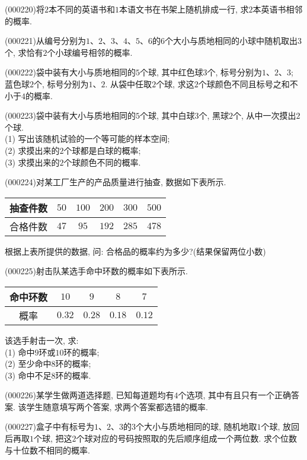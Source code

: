 \item (000220)将$2$本不同的英语书和$1$本语文书在书架上随机排成一行, 求$2$本英语书相邻的概率.
\item (000221)从编号分别为$1$、$2$、$3$、$4$、$5$、$6$的$6$个大小与质地相同的小球中随机取出$3$个, 求恰有$2$个小球编号相邻的概率.
\item (000222)袋中装有大小与质地相同的$5$个球, 其中红色球$3$个, 标号分别为$1$、$2$、$3$; 蓝色球$2$个, 标号分别为$1$、$2$. 从袋中任取$2$个球, 求这$2$个球颜色不同且标号之和不小于$4$的概率.
\item (000223)袋中装有大小与质地相同的$5$个球, 其中白球$3$个, 黑球$2$个, 从中一次摸出$2$个球.\\
(1) 写出该随机试验的一个等可能的样本空间;\\
(2) 求摸出来的$2$个球都是白球的概率;\\
(3) 求摸出来的$2$个球颜色不同的概率.
\item (000224)对某工厂生产的产品质量进行抽查, 数据如下表所示.
\begin{center}
    \begin{tabular}{|c|c|c|c|c|c|}
        \hline
        抽查件数 & $50$ & $100$ & $200$ & $300$ & $500$\\ \hline
        合格件数 & $47$ & $95$ & $192$ & $285$ & $478$\\ \hline        
    \end{tabular}
\end{center}
根据上表所提供的数据, 问: 合格品的概率约为多少?(结果保留两位小数)
\item (000225)射击队某选手命中环数的概率如下表所示.
\begin{center}
    \begin{tabular}{|c|c|c|c|c|}
        \hline
        命中环数 & $10$ & $9$ & $8$ & $7$\\ \hline
        概率 & $0.32$ & $0.28$ & $0.18$ & $0.12$ \\ \hline        
    \end{tabular}
\end{center}
该选手射击一次, 求:\\
(1) 命中$9$环或$10$环的概率;\\
(2) 至少命中$8$环的概率;\\
(3) 命中不足$8$环的概率.
\item (000226)某学生做两道选择题, 已知每道题均有$4$个选项, 其中有且只有一个正确答案. 该学生随意填写两个答案, 求两个答案都选错的概率.
\item (000227)盒子中有标号为$1$、$2$、$3$的$3$个大小与质地相同的球, 随机地取$1$个球, 放回后再取$1$个球, 把这$2$个球对应的号码按照取的先后顺序组成一个两位数. 求个位数与十位数不相同的概率.
